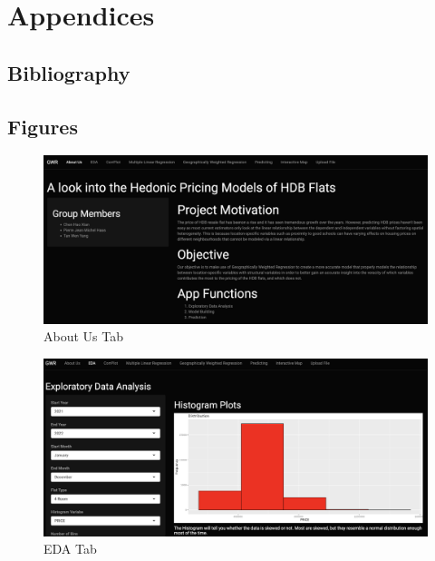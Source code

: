 \documentclass[manuscript,screen]{acmart}
\begin{document}
\hypertarget{appendices}{%
\section{Appendices}\label{appendices}}

\hypertarget{bibliography}{%
\subsection{Bibliography}\label{bibliography}}





\hypertarget{figures}{%
\subsection{Figures}\label{figures}}

\begin{figure}

{\centering \includegraphics{images/Screenshot 2023-04-14 at 11.08.12 PM.png}

}

\caption{\label{fig-1}About Us Tab}

\end{figure}

\begin{figure}

{\centering \includegraphics{images/Screenshot 2023-04-14 at 11.34.06 PM.png}

}

\caption{\label{fig-2}EDA Tab}

\end{figure}
\end{document}
